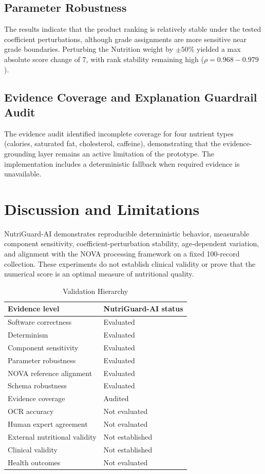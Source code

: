 \documentclass[conference]{IEEEtran}
\begin{document}
\subsection{Parameter Robustness}
The results indicate that the product ranking is relatively stable under the tested coefficient perturbations, although grade assignments are more sensitive near grade boundaries. Perturbing the Nutrition weight by $\pm 50\%$ yielded a max absolute score change of 7, with rank stability remaining high ($\rho = 0.968-0.979$).

\subsection{Evidence Coverage and Explanation Guardrail Audit}
The evidence audit identified incomplete coverage for four nutrient types (calories, saturated fat, cholesterol, caffeine), demonstrating that the evidence-grounding layer remains an active limitation of the prototype. The implementation includes a deterministic fallback when required evidence is unavailable.

\section{Discussion and Limitations}
NutriGuard-AI demonstrates reproducible deterministic behavior, measurable component sensitivity, coefficient-perturbation stability, age-dependent variation, and alignment with the NOVA processing framework on a fixed 100-record collection. These experiments do not establish clinical validity or prove that the numerical score is an optimal measure of nutritional quality.

\begin{table}[h]
\caption{Validation Hierarchy}
\begin{center}
\begin{tabular}{|l|l|}
\hline
\textbf{Evidence level} & \textbf{NutriGuard-AI status} \\
\hline
Software correctness & Evaluated \\
Determinism & Evaluated \\
Component sensitivity & Evaluated \\
Parameter robustness & Evaluated \\
NOVA reference alignment & Evaluated \\
Schema robustness & Evaluated \\
Evidence coverage & Audited \\
OCR accuracy & Not evaluated \\
Human expert agreement & Not evaluated \\
External nutritional validity & Not established \\
Clinical validity & Not established \\
Health outcomes & Not evaluated \\
\hline
\end{tabular}
\end{center}
\end{table}
\end{document}
